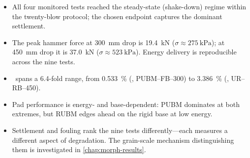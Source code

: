\begin{chaptertakeaways}
\begin{itemize}[leftmargin=*,itemsep=2pt,topsep=2pt]
    \item All four monitored tests reached the steady-state (shake-down)
          regime within the twenty-blow protocol; the chosen endpoint
          captures the dominant settlement.
    \item The peak hammer force at \SI{300}{\milli\metre} drop is
          \SI{19.4}{\kilo\newton} ($\sigma\approx\SI{275}{\kilo\pascal}$);
          at \SI{450}{\milli\metre} drop it is \SI{37.0}{\kilo\newton}
          ($\sigma\approx\SI{523}{\kilo\pascal}$). Energy delivery is
          reproducible across the nine tests.
    \item \FIIN\ spans a 6.4-fold range, from \SI{0.533}{\percent}
          (, \gls{PUBM}--\gls{FB}--300) to
          \SI{3.386}{\percent} (, \gls{UR}--\gls{RB}--450).
    \item Pad performance is energy- and base-dependent: \gls{PUBM}
          dominates at both extremes, but \gls{RUBM} edges ahead on the
          rigid base at low energy.
    \item Settlement and fouling rank the nine tests differently---each
          measures a different aspect of degradation. The grain-scale
          mechanism distinguishing them is investigated in
          \cref{chap:morph-results}.
\end{itemize}
\end{chaptertakeaways}
